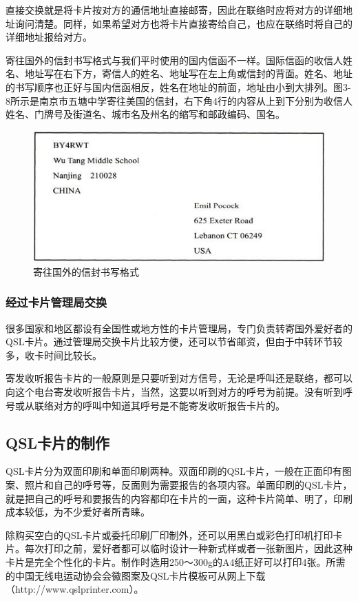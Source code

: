 \documentclass[12pt,UTF8]{ctexbook}
\begin{document}
直接交换就是将卡片按对方的通信地址直接邮寄，因此在联络时应将对方的详细地址询问清楚。同样，如果希望对方也将卡片直接寄给自己，也应在联络时将自己的详细地址报给对方。

寄往国外的信封书写格式与我们平时使用的国内信函不一样。国际信函的收信人姓名、地址写在右下方，寄信人的姓名、地址写在左上角或信封的背面。姓名、地址的书写顺序也正好与国内信函相反，姓名在地址的前面，地址由小到大排列。图3-8所示是南京市五塘中学寄往美国的信封，右下角4行的内容从上到下分别为收信人姓名、门牌号及街道名、城市名及州名的缩写和邮政编码、国名。

\begin{figure}[htbp]
	\centering
	\includegraphics[width=0.7\linewidth]{42}
	\caption{寄往国外的信封书写格式}
	\label{fig:1}
\end{figure}

\subsubsection{经过卡片管理局交换}

很多国家和地区都设有全国性或地方性的卡片管理局，专门负责转寄国外爱好者的QSL卡片。通过管理局交换卡片比较方便，还可以节省邮资，但由于中转环节较多，收卡时间比较长。

寄发收听报告卡片的一般原则是只要听到对方信号，无论是呼叫还是联络，都可以向这个电台寄发收听报告卡片，当然，这要以听到对方的呼号为前提。没有听到呼号或从联络对方的呼叫中知道其呼号是不能寄发收听报告卡片的。

\subsection{QSL卡片的制作}

QSL卡片分为双面印刷和单面印刷两种。双面印刷的QSL卡片，一般在正面印有图案、照片和自己的呼号等，反面则为需要报告的各项内容。单面印刷的QSL卡片，就是把自己的呼号和要报告的内容都印在卡片的一面，这种卡片简单、明了，印刷成本较低，为不少爱好者所青睐。

除购买空白的QSL卡片或委托印刷厂印制外，还可以用黑白或彩色打印机打印卡片。每次打印之前，爱好者都可以临时设计一种新式样或者一张新图片，因此这种卡片是完全个性化的卡片。制作时选用250～300g的A4纸正好可以打印4张。所需的中国无线电运动协会会徽图案及QSL卡片模板可从网上下载（http://www.qslprinter.com）。
\end{document}
